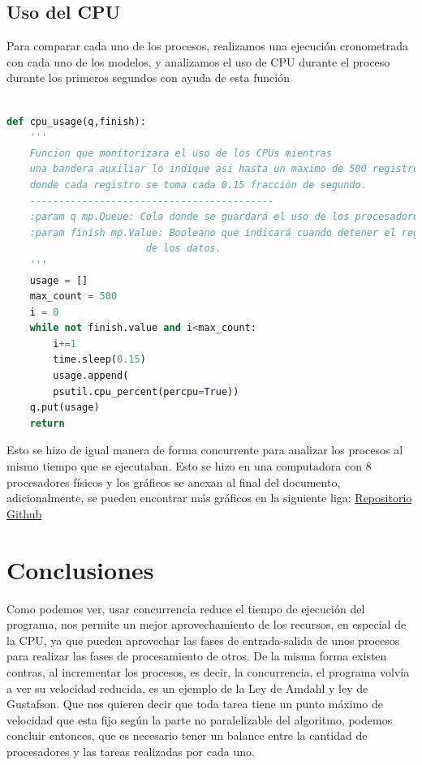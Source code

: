 \documentclass[a4paper,twocolumn,10pt]{article}
\begin{document}
\subsection{Uso del CPU}

 Para comparar cada uno de los procesos, realizamos una ejecución cronometrada con cada uno de los modelos, y analizamos el uso de CPU durante el proceso durante los primeros segundos con ayuda de esta función 

\begin{lstlisting}[language=Python]
    
def cpu_usage(q,finish):
    '''
    Funcion que monitorizara el uso de los CPUs mientras
    una bandera auxiliar lo indique asi hasta un maximo de 500 registros
    donde cada registro se toma cada 0.15 fracción de segundo.
    ------------------------------------------
    :param q mp.Queue: Cola donde se guardará el uso de los procesadores
    :param finish mp.Value: Booleano que indicará cuando detener el registro
                        de los datos.
    '''
    usage = []
    max_count = 500
    i = 0
    while not finish.value and i<max_count:
        i+=1
        time.sleep(0.15)
        usage.append(
        psutil.cpu_percent(percpu=True))
    q.put(usage)
    return
\end{lstlisting}

Esto se hizo de igual manera de forma concurrente para analizar los procesos al mismo tiempo que se ejecutaban. Esto se hizo en una computadora con 8 procesadores físicos y los gráficos se anexan al final del documento, adicionalmente, se pueden encontrar más gráficos en la siguiente liga: \href{https://github.com/Equipo-Alfa-Lobo-Dinamita/LCD-CC-2021-I/tree/main/Proyecto/Plots}{Repositorio Github}

\section{ Conclusiones }
Como podemos ver, usar concurrencia reduce el tiempo de ejecución del programa, nos permite un mejor aprovechamiento de los recursos, en especial de la CPU, ya que pueden aprovechar las fases de entrada-salida de unos procesos para realizar las fases de procesamiento de otros. De la misma forma existen contras, al incrementar los procesos, es decir, la concurrencia, el programa volvía a ver su velocidad reducida, es un ejemplo de la Ley de Amdahl y ley de Gustafson. Que nos quieren decir que toda tarea tiene un punto máximo de velocidad que esta fijo según la parte no paralelizable del algoritmo, podemos concluir entonces, que es necesario tener un balance entre la cantidad de procesadores y las tareas realizadas por cada uno. 
\end{document}
